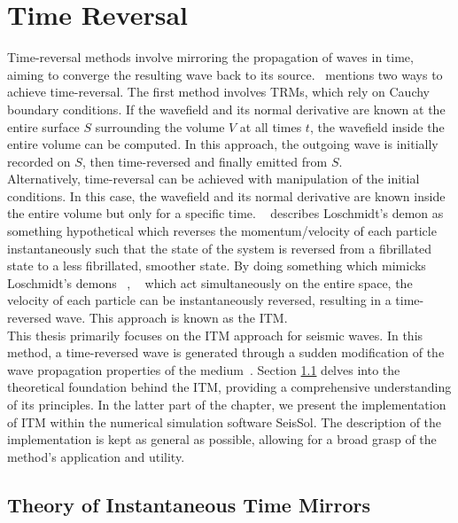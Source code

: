 \chapter{Time Reversal}\label{chapter:TimeReversal}

Time-reversal methods involve mirroring the propagation of waves in time, aiming to converge the resulting wave back to its source.~\parencite{Fink2017} mentions two ways to achieve time-reversal.
The first method involves \ac{TRM}s, which rely on Cauchy boundary conditions. If the wavefield and its normal derivative are known at the entire surface $S$ surrounding the volume
$V$ at all times $t$, the wavefield inside the entire volume can be computed. In this approach, the outgoing wave is initially 
recorded on $S$, then time-reversed and finally emitted from $S$. \\

Alternatively, time-reversal can be achieved with manipulation of the initial conditions. In this case, the wavefield and its normal derivative
are known inside the entire volume but only for a specific time. 
~\parencite{Weinert2016} describes Loschmidt's demon as something hypothetical which reverses the momentum/velocity of each particle instantaneously such that the state of the system is reversed 
from a fibrillated state to a less fibrillated, smoother state.
By doing something which mimicks Loschmidt's demons ~\parencite{Weinert2016}, ~\parencite{Fink2017} which act simultaneously on the entire space, the velocity of each particle can be instantaneously reversed, resulting in a time-reversed wave. This approach is known as the \ac{ITM}.\\

This thesis primarily focuses on the \ac{ITM} approach for seismic waves. In this method, a time-reversed wave is generated through a sudden modification of the wave propagation
properties of the medium~\parencite{Bacot2016}. Section \ref{section:ITMTheory} delves into the theoretical foundation behind the \ac{ITM}, providing a comprehensive
understanding of its principles. In the latter part of the chapter, we present the implementation of \ac{ITM} within the numerical simulation software SeisSol. The
description of the implementation is kept as general as possible, allowing for a broad grasp of the method's application and utility.

\section{Theory of Instantaneous Time Mirrors}\label{section:ITMTheory}

